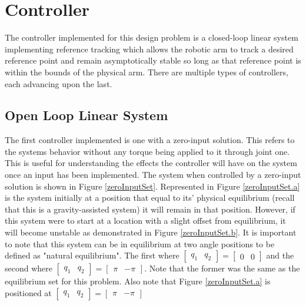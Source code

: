 \documentclass[12pt]{article}
\begin{document}
\section{Controller}
The controller implemented for this design problem is a closed-loop linear system implementing reference tracking which allows the robotic arm to track a desired reference point and remain asymptotically stable so long as that reference point is within the bounds of the physical arm. There are multiple types of controllers, each advancing upon the last.
\subsection{Open Loop Linear System}
The first controller implemented is one with a zero-input solution. This refers to the systems behavior without any torque being applied to it through joint one. This is useful for understanding the effects the controller will have on the system once an input has been implemented. The system when controlled by a zero-input solution is shown in Figure \ref{zeroInputSet}. Represented in Figure \ref{zeroInputSet.a} is the system initially at a position that equal to its' physical equilibrium (recall that this is a gravity-assisted system) it will remain in that position. However, if this system were to start at a location with a slight offset from equilibrium, it will become unstable as demonstrated in Figure \ref{zeroInputSet.b}. It is important to note that this system can be in equilibrium at two angle positions to be defined as "natural equilibrium". The first where $\begin{bmatrix}q_{1} & q_{2}\end{bmatrix} = \begin{bmatrix}0 & 0\end{bmatrix}$ and the second where  $\begin{bmatrix}q_{1} & q_{2}\end{bmatrix} = \begin{bmatrix}\pi & -\pi \end{bmatrix}$. Note that the former was the same as the equilibrium set for this problem. Also note that Figure \ref{zeroInputSet.a} is positioned at $\begin{bmatrix} q_{1} & q_{2} \end{bmatrix} = \begin{bmatrix} \pi & -\pi \end{bmatrix}$
\end{document}
